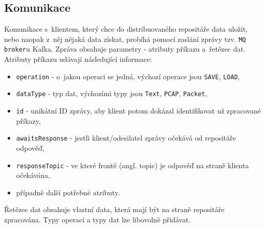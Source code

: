 \subsection{Komunikace}
Komunikace s~klientem, který chce do distribuovaného repositáře data uložit, nebo naopak z~něj nějaká data získat, probíhá pomocí zaslání zprávy tzv. \texttt{MQ broker}u Kafka. Zpráva obsahuje parametry - atributy příkazu a~řetězec dat. Atributy příkazu udávají následující informace:

\begin{itemize}
    \item \texttt{operation} - o~jakou operaci se jedná, výchozí operace jsou \texttt{SAVE}, \texttt{LOAD},
    
    \item \texttt{dataType} - typ dat,  výchozími typy jsou \texttt{Text}, \texttt{PCAP}, \texttt{Packet},
    
    \item \texttt{id} - unikátní ID zprávy, aby klient potom dokázal identifikovat už zpracované příkazy,
    
    \item \texttt{awaitsResponse} - jestli klient/odesilatel zprávy očekává od repositáře odpověď,
    
    \item \texttt{responseTopic} - ve které frontě (angl. topic) je odpověď na straně klienta očekávána,
    
    \item případně další potřebné atributy.
\end{itemize}

\noindent Řetězec dat obsahuje vlastní data, která mají být na straně repositáře zpracována. Typy operací a typy dat lze libovolně přidávat.

